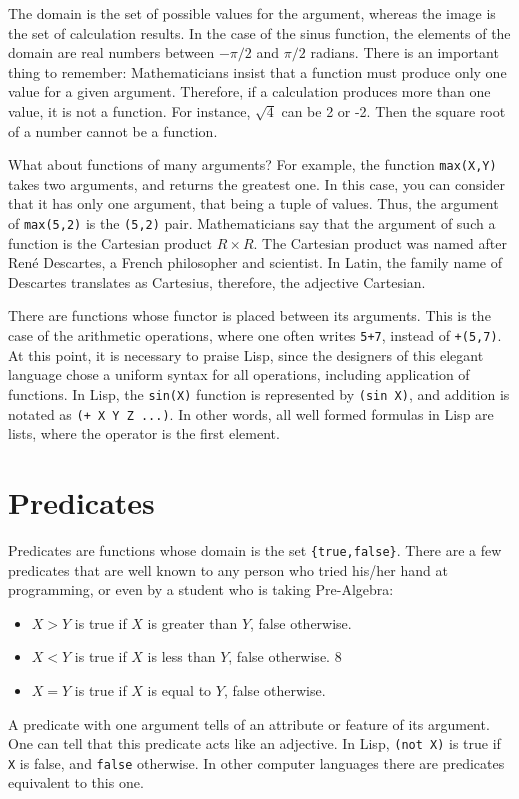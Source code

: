 \documentclass[a4paper,12pt]{book}
\begin{document}
The domain is the set of possible values for the
argument, whereas the image is the set of calculation
results. In the case of the sinus function,
the elements of the domain are real numbers
between $-\pi/2$ and $\pi/2$ radians. There
is an important thing to remember: 
Mathematicians insist that a function must produce
only one value for a given argument. Therefore,
if a calculation produces more than one value,
it is not a function. For instance, $\sqrt{4}$
can be 2 or -2. Then the square root of a number
cannot be a function. 

What about functions of many arguments? For example,
the function \verb|max(X,Y)| takes two arguments,
and returns the greatest one. In this case, you can
consider that it has only one argument, that being a
tuple of values. Thus, the argument of \verb|max(5,2)|
is the \verb|(5,2)| pair. Mathematicians say that the
argument of such a function is the Cartesian product
$R\times R$. The Cartesian product was named after
René Descartes, a French philosopher and scientist.
In Latin, the family name of Descartes translates
as Cartesius, therefore, the adjective Cartesian.

There are functions whose functor is placed between
its arguments. This is the case of the arithmetic
operations, where one often writes \verb|5+7|, instead
of \verb|+(5,7)|. At this point, it is necessary to
praise Lisp, since the designers of this elegant language
chose a uniform syntax for all operations, including
application of functions. In Lisp, the \verb|sin(X)|
function is represented by \verb|(sin X)|, and 
addition is notated as \verb|(+ X Y Z ...)|. In other
words, all well formed formulas in Lisp are lists, where
the operator is the first element.

\section{Predicates}
Predicates are functions whose domain is the set
\verb|{true,false}|. There are a few predicates
that are well known to any person who tried his/her
hand at programming, or even by a student who is
taking Pre-Algebra:
\begin{itemize}
	\item $X>Y$ is true if $X$ is greater than $Y$, false otherwise.
	\item $X<Y$ is true if $X$ is less than $Y$, false otherwise.
	8\item $X=Y$ is true if $X$ is equal to $Y$, false otherwise.
\end{itemize}
A predicate with one argument tells of an attribute or feature
of its argument. One can tell that this predicate acts like
an adjective. In Lisp, \verb|(not X)| is true if \verb|X| is
false, and \verb|false| otherwise. In other computer languages
there are predicates equivalent to this one.
\end{document}
